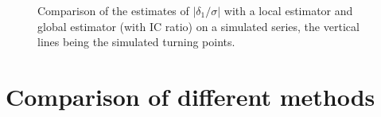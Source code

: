 \documentclass[
]{article}
\newcommand\1{\mathds{1}}
\begin{document}
\begin{figure}

\caption{\label{fig-mmpenteconcac-ex}Comparison of the estimates of
\(|\delta_1/\sigma|\) with a local estimator and global estimator (with
IC ratio) on a simulated series, the vertical lines being the simulated
turning points.}\begin{minipage}[t]{\linewidth}

{\centering 


}

\end{minipage}%
\newline
\begin{minipage}[t]{\linewidth}

{\centering 


}

\end{minipage}%

\end{figure}

\hypertarget{sec-comparison}{%
\section{Comparison of different methods}\label{sec-comparison}}
\end{document}
